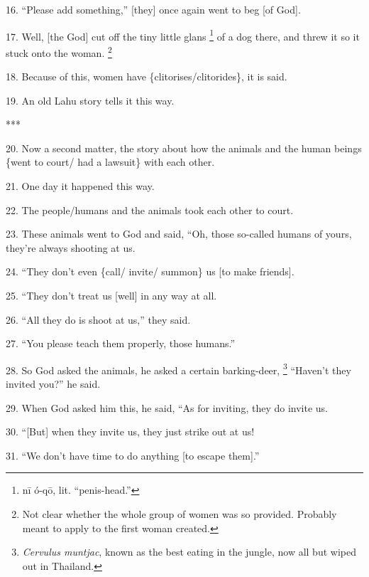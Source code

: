 16. ``Please add something,'' [they] once again went to beg [of God].

17. Well, [the God] cut off the tiny little glans \footnote{nī ó-qō, lit. ``penis-head.''} of a dog there, and threw
it so it stuck onto the woman. \footnote{Not clear whether the whole group of women was so provided. Probably meant to apply to the first woman created.}

18. Because of this, women have \{clitorises/clitorides\}, it is said.

19. An old Lahu story tells it this way.

***

20. Now a second matter, the story about how the animals and the human beings \{went
to court/ had a lawsuit\} with each other.

21. One day it happened this way.

22. The people/humans and the animals took each other to court.

23. These animals went to God and said, ``Oh, those so-called humans of yours,
they're always shooting at us.

24. ``They don't even \{call/ invite/ summon\} us [to make friends].

25. ``They don't treat us [well] in any way at all.

26. ``All they do is shoot at us,'' they said.

27. ``You please teach them properly, those humans.''

28. So God asked the animals, he asked a certain barking-deer, \footnote{\textit{Cervulus muntjac}, known as the best eating in the jungle, now all but wiped out in Thailand.} ``Haven't they
invited you?'' he said.

29. When God asked him this, he said, ``As for inviting, they do invite us.

30. ``[But] when they invite us, they just strike out at us!

31. ``We don't have time to do anything [to escape them].''

